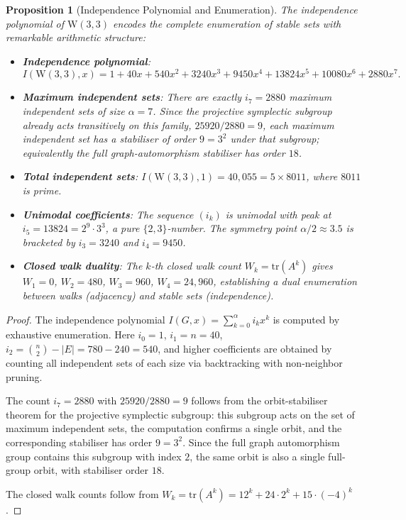 \documentclass[12pt,a4paper]{article}
\newtheorem{proposition}[theorem]{Proposition}
\newcommand{\W}{\mathrm{W}(3,3)}
\begin{document}
\begin{proposition}[Independence Polynomial and Enumeration]\label{prop:independence}
The independence polynomial of $\W$ encodes the complete enumeration of stable
sets with remarkable arithmetic structure:
\begin{itemize}
  \item \textbf{Independence polynomial}:
        \[
          I(\W, x) = 1 + 40x + 540x^2 + 3240x^3 + 9450x^4 + 13824x^5 + 10080x^6 + 2880x^7.
        \]
  \item \textbf{Maximum independent sets}: There are exactly $i_7 = 2880$ maximum independent sets
      of size $\alpha = 7$. Since the projective symplectic subgroup already acts transitively on
      this family, $25920/2880 = 9$, each maximum independent set has a stabiliser of order
      $9 = 3^2$ under that subgroup; equivalently the full graph-automorphism stabiliser has
      order $18$.
  \item \textbf{Total independent sets}: $I(\W, 1) = 40{,}055 = 5 \times 8011$, where
        $8011$ is prime.
  \item \textbf{Unimodal coefficients}: The sequence $(i_k)$ is unimodal with peak at $i_5 = 13824 = 2^9 \cdot 3^3$,
        a pure $\{2,3\}$-number.  The symmetry point $\alpha/2 \approx 3.5$ is bracketed by
        $i_3 = 3240$ and $i_4 = 9450$.
  \item \textbf{Closed walk duality}: The $k$-th closed walk count $W_k = \mathrm{tr}(A^k)$
        gives $W_1 = 0$, $W_2 = 480$, $W_3 = 960$, $W_4 = 24{,}960$, establishing a
        dual enumeration between walks (adjacency) and stable sets (independence).
\end{itemize}
\end{proposition}

\begin{proof}
The independence polynomial $I(G,x) = \sum_{k=0}^{\alpha} i_k x^k$ is computed by exhaustive
enumeration.  Here $i_0 = 1$, $i_1 = n = 40$, $i_2 = \binom{n}{2} - |E| = 780 - 240 = 540$, %
and higher coefficients are obtained by counting all independent sets of each size via backtracking
with non-neighbor pruning.

The count $i_7 = 2880$ with $25920/2880 = 9$ follows from the orbit-stabiliser theorem for the
projective symplectic subgroup: this subgroup acts on the set of maximum independent sets, the
computation confirms a single orbit, and the corresponding stabiliser has order $9 = 3^2$.
Since the full graph automorphism group contains this subgroup with index $2$, the same orbit is
also a single full-group orbit, with stabiliser order $18$.

The closed walk counts follow from $W_k = \mathrm{tr}(A^k) = 12^k + 24 \cdot 2^k + 15 \cdot (-4)^k$.
\end{proof}
\end{document}
